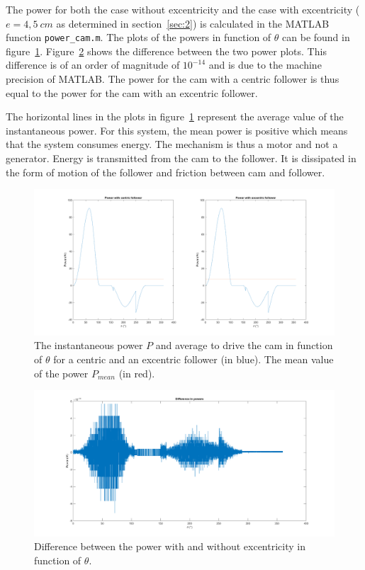 \documentclass[a4paper]{article}
\begin{document}
The power for both the case without excentricity and the case with excentricity (\(e=4,5~cm\) as determined in section~\ref{sec:2}) is calculated in the MATLAB function \texttt{power\_cam.m}. The plots of the powers in function of \(\theta\) can be found in figure~\ref{fig:powerplot}. Figure~\ref{diffpower} shows the difference between the two power plots. This difference is of an order of magnitude of \(10^{-14}\) and is due to the machine precision of MATLAB. The power for the cam with a centric follower is thus equal to the power for the cam with an excentric follower.

The horizontal lines in the plots in figure~\ref{fig:powerplot} represent the average value of the instantaneous power. For this system, the mean power is positive which means that the system consumes energy. The mechanism is thus a motor and not a generator. Energy is transmitted from the cam to the follower. It is dissipated in the form of motion of the follower and friction between cam and follower.

\begin{figure}
	\centering
	\includegraphics[width=\textwidth]{powerplot.png}
	\caption{The instantaneous power \(P\) and average to drive the cam in function of \(\theta\) for a centric and an excentric follower (in blue). The mean value of the power \(P_{mean}\) (in red).}
	\label{fig:powerplot}
	
\end{figure}

\begin{figure}
	\centering
	\includegraphics[width=\textwidth]{diffpower.png}
	\caption{Difference between the power with and without excentricity in function of \(\theta\).}
	\label{diffpower}
\end{figure}
\end{document}
